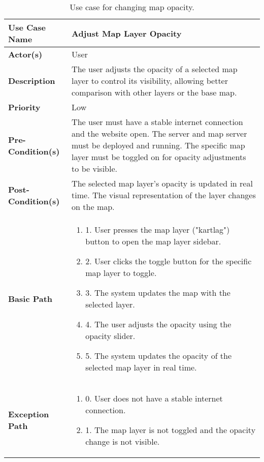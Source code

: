 \begin{table}[h]
    \centering
    \renewcommand{\arraystretch}{1.5}
    \begin{tabularx}{\textwidth}{|l|X|}
        \hline
        \rowcolor{gray!20}
        \textbf{Use Case Name} & Adjust Map Layer Opacity \\
        \hline
        \textbf{Actor(s)} & User \\
        \hline
        \textbf{Description} & The user adjusts the opacity of a selected map layer to control its visibility, allowing better comparison with other layers or the base map. \\\hline
        \textbf{Priority} & Low \\
        \hline
        \textbf{Pre-Condition(s)} & The user must have a stable internet connection and the website open. The server and map server must be deployed and running. The specific map layer must be toggled on for opacity adjustments to be visible. \\
        \hline
        \textbf{Post-Condition(s)} & The selected map layer’s opacity is updated in real time. The visual representation of the layer changes on the map. \\
        \hline
        \textbf{Basic Path} &  
        \begin{enumerate}[label=,left=0pt]
            \item 1. User presses the map layer ("kartlag") button to open the map layer sidebar.
            \item 2. User clicks the toggle button for the specific map layer to toggle.
            \item 3. The system updates the map with the selected layer.
            \item 4. The user adjusts the opacity using the opacity slider.
            \item 5. The system updates the opacity of the selected map layer in real time. 
        \end{enumerate} \\
        \hline
        \textbf{Exception Path} & 
        \begin{enumerate}[label=,left=0pt]
            \item 0. User does not have a stable internet connection.
            \item 1. The map layer is not toggled and the opacity change is not visible.
        \end{enumerate} \\
        \hline
    \end{tabularx}
    \caption[Use Case Specification: Adjust Map Layer Opacity]{Use case for changing map opacity.}
    \label{tab:use_case_map_opacity_appendix}
\end{table}

